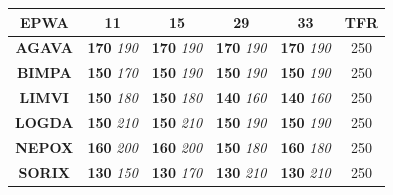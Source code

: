 
\centering
{}
\begin{tabular}{|c|c|c|c|c|c|}
	\hline
	\rowcolor{white}
	\color{white}\cellcolor{vred}\textbf{EPWA} & \textbf{11}               & \textbf{15}               & \textbf{29}               & \textbf{33}               & \textbf{TFR} \\\hline
	\textbf{AGAVA}                             & \textbf{170} \textit{190} & \textbf{170} \textit{190} & \textbf{170} \textit{190} & \textbf{170} \textit{190} & 250          \\\hline
	\textbf{BIMPA}                             & \textbf{150} \textit{170} & \textbf{150} \textit{190} & \textbf{150} \textit{190} & \textbf{150} \textit{190} & 250          \\\hline
	\textbf{LIMVI}                             & \textbf{150} \textit{180} & \textbf{150} \textit{180} & \textbf{140} \textit{160} & \textbf{140} \textit{160} & 250          \\\hline
	\textbf{LOGDA}                             & \textbf{150} \textit{210} & \textbf{150} \textit{210} & \textbf{150} \textit{190} & \textbf{150} \textit{190} & 250          \\\hline
	\textbf{NEPOX}                             & \textbf{160} \textit{200} & \textbf{160} \textit{200} & \textbf{150} \textit{180} & \textbf{160} \textit{180} & 250          \\\hline
	\textbf{SORIX}                             & \textbf{130} \textit{150} & \textbf{130} \textit{170} & \textbf{130} \textit{210} & \textbf{130} \textit{210} & 250          \\\hline
\end{tabular}


